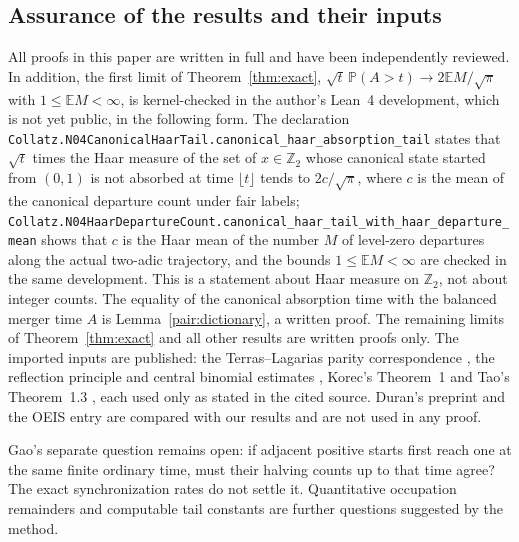 \documentclass[11pt]{amsart}
\theoremstyle{definition}
\theoremstyle{remark}
\newcommand{\E}{\mathbb E}
\newcommand{\PP}{\mathbb P}
\newcommand{\Ztwo}{\mathbb Z_2}
\begin{document}
\subsection*{Assurance of the results and their inputs}
All proofs in this paper are written in full and have been independently
reviewed. In addition, the first limit of Theorem~\ref{thm:exact},
$\sqrt t\,\PP(A>t)\to2\E M/\sqrt\pi$ with $1\le\E M<\infty$, is
kernel-checked in the author's Lean~4 development, which is not yet
public, in the following form. The declaration
\nolinkurl{Collatz.N04CanonicalHaarTail.canonical_haar_absorption_tail}
states that $\sqrt t$ times the Haar measure of the set of
$x\in\Ztwo$ whose canonical state started from $(0,1)$ is not absorbed
at time $\lfloor t\rfloor$ tends to $2c/\sqrt\pi$, where $c$ is the mean
of the canonical departure count under fair labels;
\nolinkurl{Collatz.N04HaarDepartureCount.canonical_haar_tail_with_haar_departure_mean}
shows that $c$ is the Haar mean of the number $M$ of level-zero
departures along the actual two-adic trajectory, and the bounds
$1\le\E M<\infty$ are checked in the same development. This is a
statement about Haar measure on $\Ztwo$, not about integer counts. The
equality of the canonical absorption time with the balanced merger time
$A$ is Lemma~\ref{pair:dictionary}, a written proof. The remaining limits of
Theorem~\ref{thm:exact} and all other results are written proofs only.
The imported inputs are published: the Terras--Lagarias parity
correspondence \cite{Terras1976,Lagarias1985}, the reflection principle
and central binomial estimates \cite{Feller}, Korec's Theorem~1
\cite{Korec1994} and Tao's Theorem~1.3 \cite{Tao2022}, each used only as
stated in the cited source. Duran's preprint \cite{Duran2026} and the
OEIS entry \cite{OEIS398792} are compared with our results and are not
used in any proof.

Gao's separate question remains open: if adjacent positive starts first
reach one at the same finite ordinary time, must their halving counts up
to that time agree? The exact synchronization rates do not settle it.
Quantitative occupation remainders and computable tail constants are
further questions suggested by the method.
\end{document}

